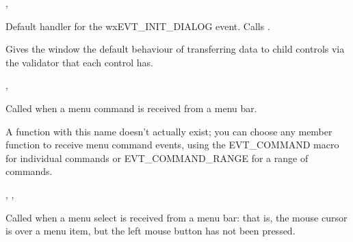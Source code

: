 
, 

\label{wxwindowoninitdialog}


Default handler for the wxEVT\_INIT\_DIALOG event. Calls .




Gives the window the default behaviour of transferring data to child controls via
the validator that each control has.


, 

\label{wxwindowonmenucommand}


Called when a menu command is received from a menu bar.




A function with this name doesn't actually exist; you can choose any member function to receive
menu command events, using the EVT\_COMMAND macro for individual commands or EVT\_COMMAND\_RANGE for
a range of commands.


,\rtfsp
{},\rtfsp
{}

\label{wxwindowonmenuhighlight}


Called when a menu select is received from a menu bar: that is, the
mouse cursor is over a menu item, but the left mouse button has not been
pressed.

